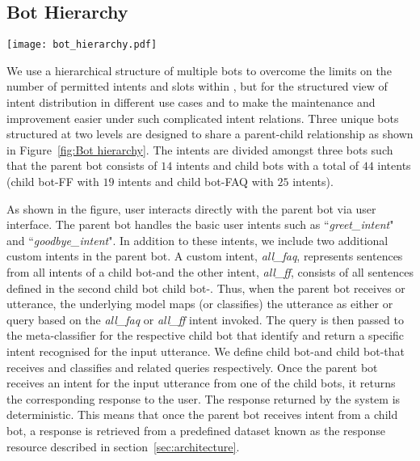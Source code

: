\documentclass[runningheads]{llncs}
\begin{document}
\subsection{Bot Hierarchy}
%
\begin{figure*}
    \centering
    \texttt{[image: bot\_hierarchy.pdf]}
    \caption{Bot hierarchy}
    \label{fig:Bot hierarchy}
\end{figure*}
%
We use a hierarchical structure of multiple bots to overcome the limits on the number of permitted intents and slots within \lex, but for the structured view of intent distribution in different use cases and to make the maintenance and improvement easier under such complicated intent relations.
Three unique bots structured at two levels are designed to share a parent-child relationship as shown in Figure~\ref{fig:Bot hierarchy}. The intents are divided amongst three bots such that the parent bot consists of $14$ intents and child bots with a total of $44$ intents (child bot-FF with $19$ intents and child bot-FAQ with $25$ intents). 

As shown in the figure, user interacts directly with the parent bot via user interface. The parent bot handles the basic user intents such as ``\textit{greet\_intent}" and ``\textit{goodbye\_intent}". In addition to these intents, we include two additional custom intents in the parent bot. A custom intent, \textit{all\_faq}, represents sentences from all intents of a child bot-\faq and the other intent, \textit{all\_ff}, consists of all sentences defined in the second child bot child bot-\ff. Thus, when the parent bot receives \ff or \faq utterance, the underlying model maps (or classifies) the utterance as either \faq or \ff query based on the \textit{all\_faq} or \textit{all\_ff} intent invoked. The query is then passed to the meta-classifier for the respective child bot that identify and return a specific intent recognised for the input utterance. We define child bot-\faq and child bot-\ff that receives and classifies \faq and \ff related queries respectively. Once the parent bot receives an intent for the input utterance from one of the child bots, it returns the corresponding response to the user. The response returned by the system is deterministic. This means that once the parent bot receives intent from a child bot, a response is retrieved from a predefined dataset known as the response resource described in section~\ref{sec:architecture}.
\end{document}
